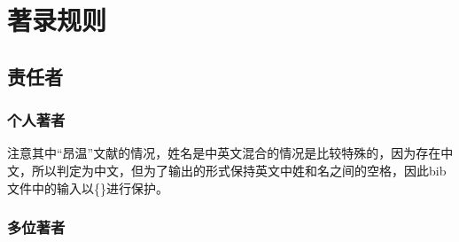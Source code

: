 \documentclass{article}
\begin{document}
\begin{refsection}
\nocite{DUBAR2013--}
\nocite{余建斌2013--}
\nocite{Bawden2008--}
\printbibliography[heading=subbibliography,title={符号()示例}]
\end{refsection}

\begin{refsection}
\nocite{DUBAR2013--}
\printbibliography[heading=subbibliography,title={符号{[}{]}示例}]
\end{refsection}

\begin{refsection}
\nocite{Dowler1995-5-26}
\nocite{DUBAR2013--}
\printbibliography[heading=subbibliography,title={符号/示例}]
\end{refsection}

\begin{refsection}
\nocite{Dowler1995-5-26}
\nocite{DUBAR2013--}
\printbibliography[heading=subbibliography,title={符号-示例}]
\end{refsection}

\section{著录规则}
\subsection{责任者}
\subsubsection{个人著者}
\begin{refsection}
注意其中“昂温”文献的情况，姓名是中英文混合的情况是比较特殊的，因为存在中文，所以判定为中文，但为了输出的形式保持英文中姓和名之间的空格，因此bib文件中的输入以\{\}进行保护。
\nocite{李时珍--}
\nocite{乔纳斯--}
\nocite{昂温1988--}
\nocite{GPS1988--}
\nocite{丸山敏秋--}
\nocite{凯西尔--}
\nocite{Einstein--}
\nocite{Williams-ellis--}
\nocite{morgan--}
\nocite{lijianning--a}
\nocite{lijianning--b}
\end{refsection}

\subsubsection{多位著者}
\begin{refsection}
\nocite{钱学森--}
\nocite{李四光--}
\nocite{印森林--}
\nocite{fordham--}
\end{refsection}
\end{document}
